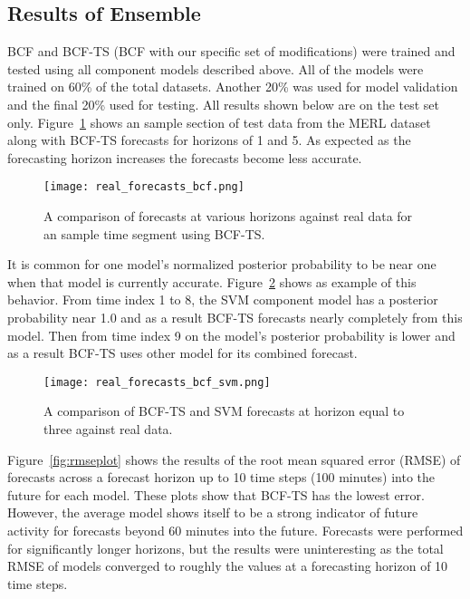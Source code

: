 \subsection{Results of Ensemble}

BCF and BCF-TS (BCF with our specific set of modifications) were trained and tested using all component models described above.  All of the models were trained on 60\% of the total datasets.  Another 20\% was used for model validation and the final 20\% used for testing.  All results shown below are on the test set only.  Figure~\ref{fig:realbcf} shows an sample section of test data from the MERL dataset along with BCF-TS forecasts for horizons of 1 and 5.   As expected as the forecasting horizon increases the forecasts become less accurate.

\begin{figure}[h]
\centering
\texttt{[image: real\_forecasts\_bcf.png]}
\caption{A comparison of forecasts at various horizons against real data for an sample time segment using BCF-TS.}
\label{fig:realbcf}
\end{figure}

It is common for one model's normalized posterior probability to be near one when that model is currently accurate.  Figure~\ref{fig:realbcfsvm} shows as example of this behavior.  From time index 1 to 8, the SVM component model has a posterior probability near 1.0 and as a result BCF-TS forecasts nearly completely from this model.  Then from time index 9 on the model's posterior probability is lower and as a result BCF-TS uses other model for its combined forecast.

\begin{figure}[h]
\centering
\texttt{[image: real\_forecasts\_bcf\_svm.png]}
\caption{A comparison of BCF-TS and SVM forecasts at horizon equal to three against real data.}
\label{fig:realbcfsvm}
\end{figure}

Figure~\ref{fig:rmseplot} shows the results of the root mean squared error (RMSE) of forecasts across a forecast horizon up to 10 time steps (100 minutes) into the future for each model.  These plots show that BCF-TS has the lowest error.  However, the average model shows itself to be a strong indicator of future activity for forecasts beyond 60 minutes into the future.  Forecasts were performed for significantly longer horizons, but the results were uninteresting as the total RMSE of models converged to roughly the values at a forecasting horizon of 10 time steps.  

